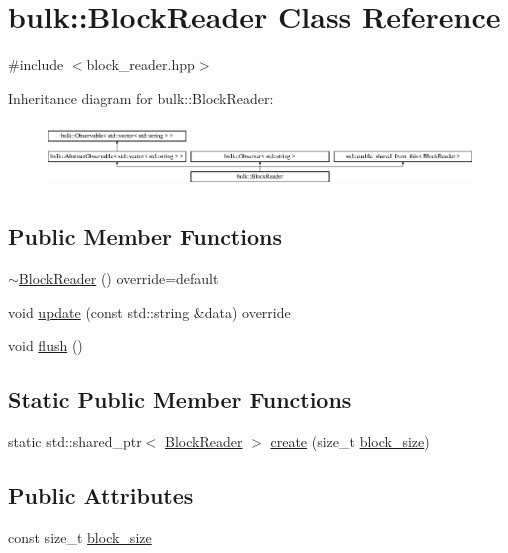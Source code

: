 \hypertarget{classbulk_1_1BlockReader}{}\section{bulk\+:\+:Block\+Reader Class Reference}
\label{classbulk_1_1BlockReader}


{\ttfamily \#include $<$block\+\_\+reader.\+hpp$>$}

Inheritance diagram for bulk\+:\+:Block\+Reader\+:\begin{figure}[H]
\begin{center}
\leavevmode
\includegraphics[height=1.744548cm]{classbulk_1_1BlockReader}
\end{center}
\end{figure}
\subsection*{Public Member Functions}
\begin{DoxyCompactItemize}
\item 
\hyperlink{classbulk_1_1BlockReader_a163856bf35ee489d5b2d0cae520fe89e}{$\sim$\+Block\+Reader} () override=default
\item 
void \hyperlink{classbulk_1_1BlockReader_a0a3b9ff69552b233b037afcd7e858ef1}{update} (const std\+::string \&data) override
\item 
void \hyperlink{classbulk_1_1BlockReader_a03c580cc41ffd5e3d1271eddba9ca261}{flush} ()
\end{DoxyCompactItemize}
\subsection*{Static Public Member Functions}
\begin{DoxyCompactItemize}
\item 
static std\+::shared\+\_\+ptr$<$ \hyperlink{classbulk_1_1BlockReader}{Block\+Reader} $>$ \hyperlink{classbulk_1_1BlockReader_af0d865e52b8882bf3ad7e2ee7de4c82e}{create} (size\+\_\+t \hyperlink{classbulk_1_1BlockReader_a368298f7d12180b3a59597b605154b1d}{block\+\_\+size})
\end{DoxyCompactItemize}
\subsection*{Public Attributes}
\begin{DoxyCompactItemize}
\item 
const size\+\_\+t \hyperlink{classbulk_1_1BlockReader_a368298f7d12180b3a59597b605154b1d}{block\+\_\+size}
\end{DoxyCompactItemize}
